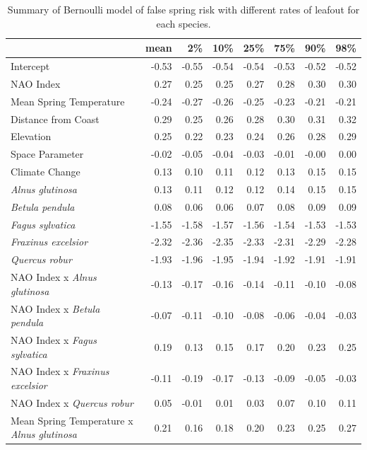 \documentclass{article}\usepackage[]{graphicx}\usepackage[]{color}
\begin{document}
\newpage
\begin{longtable}{lrrrrrrr}
\caption{Summary of Bernoulli model of false spring risk with different rates of leafout for each species.} \\ 
  \hline
 & mean & 2\% & 10\% & 25\% & 75\% & 90\% & 98\% \\ 
  \hline \endhead  \hline
Intercept & -0.53 & -0.55 & -0.54 & -0.54 & -0.53 & -0.52 & -0.52 \\ 
  NAO Index & 0.27 & 0.25 & 0.25 & 0.27 & 0.28 & 0.30 & 0.30 \\ 
  Mean Spring 
Temperature & -0.24 & -0.27 & -0.26 & -0.25 & -0.23 & -0.21 & -0.21 \\ 
  Distance from 
Coast & 0.29 & 0.25 & 0.26 & 0.28 & 0.30 & 0.31 & 0.32 \\ 
  Elevation & 0.25 & 0.22 & 0.23 & 0.24 & 0.26 & 0.28 & 0.29 \\ 
  Space Parameter & -0.02 & -0.05 & -0.04 & -0.03 & -0.01 & -0.00 & 0.00 \\ 
  Climate Change & 0.13 & 0.10 & 0.11 & 0.12 & 0.13 & 0.15 & 0.15 \\ 
  \textit{Alnus glutinosa} & 0.13 & 0.11 & 0.12 & 0.12 & 0.14 & 0.15 & 0.15 \\ 
  \textit{Betula pendula} & 0.08 & 0.06 & 0.06 & 0.07 & 0.08 & 0.09 & 0.09 \\ 
  \textit{Fagus sylvatica} & -1.55 & -1.58 & -1.57 & -1.56 & -1.54 & -1.53 & -1.53 \\ 
  \textit{Fraxinus excelsior} & -2.32 & -2.36 & -2.35 & -2.33 & -2.31 & -2.29 & -2.28 \\ 
  \textit{Quercus robur} & -1.93 & -1.96 & -1.95 & -1.94 & -1.92 & -1.91 & -1.91 \\ 
  NAO Index
x\textit{ Alnus glutinosa} & -0.13 & -0.17 & -0.16 & -0.14 & -0.11 & -0.10 & -0.08 \\ 
  NAO Index
x\textit{ Betula pendula} & -0.07 & -0.11 & -0.10 & -0.08 & -0.06 & -0.04 & -0.03 \\ 
  NAO Index
x\textit{ Fagus sylvatica} & 0.19 & 0.13 & 0.15 & 0.17 & 0.20 & 0.23 & 0.25 \\ 
  NAO Index
x\textit{ Fraxinus excelsior} & -0.11 & -0.19 & -0.17 & -0.13 & -0.09 & -0.05 & -0.03 \\ 
  NAO Index
x\textit{ Quercus robur} & 0.05 & -0.01 & 0.01 & 0.03 & 0.07 & 0.10 & 0.11 \\ 
  Mean Spring 
Temperature
x\textit{ Alnus glutinosa} & 0.21 & 0.16 & 0.18 & 0.20 & 0.23 & 0.25 & 0.27 \\ 

\end{longtable}
\end{document}
